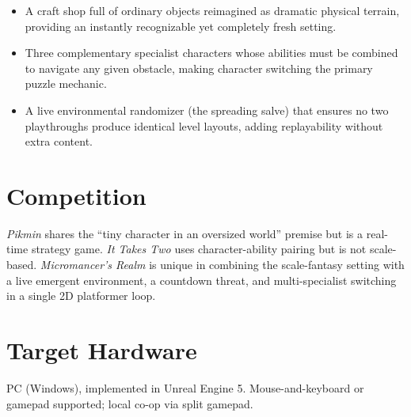 \documentclass[11pt, letterpaper]{article}
\begin{document}
\begin{itemize}[leftmargin=1.5em, itemsep=2pt]
    \item A craft shop full of ordinary objects reimagined as dramatic physical terrain, providing
    an instantly recognizable yet completely fresh setting.
    \item Three complementary specialist characters whose abilities must be combined to navigate
    any given obstacle, making character switching the primary puzzle mechanic.
    \item A live environmental randomizer (the spreading salve) that ensures no two playthroughs
    produce identical level layouts, adding replayability without extra content.
\end{itemize}

\section*{Competition}

\textit{Pikmin} shares the ``tiny character in an oversized world'' premise but is a real-time
strategy game. \textit{It Takes Two} uses character-ability pairing but is not scale-based.
\textit{Micromancer's Realm} is unique in combining the scale-fantasy setting with a live emergent
environment, a countdown threat, and multi-specialist switching in a single 2D platformer loop.

\section*{Target Hardware}

PC (Windows), implemented in Unreal Engine 5. Mouse-and-keyboard or gamepad supported; local
co-op via split gamepad.
\end{document}
